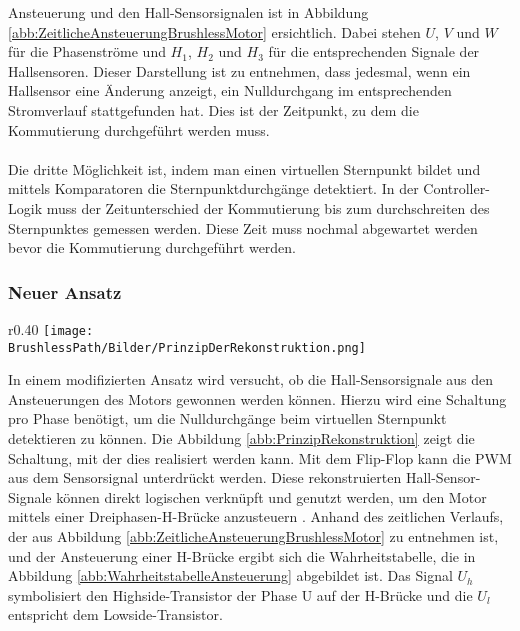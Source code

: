         Ansteuerung und den Hall-Sensorsignalen ist in Abbildung 
        \ref{abb:ZeitlicheAnsteuerungBrushlessMotor} ersichtlich. Dabei stehen 
        $U$, $V$ und $W$ für die Phasenströme und $H_1$, $H_2$ und $H_3$ für die 
        entsprechenden Signale der Hallsensoren. Dieser Darstellung ist zu 
        entnehmen, dass jedesmal, wenn ein Hallsensor eine Änderung anzeigt, 
        ein Nulldurchgang im entsprechenden Stromverlauf stattgefunden hat. 
        Dies ist der Zeitpunkt, zu dem die Kommutierung durchgeführt werden 
        muss.\\
        \\
        Die dritte Möglichkeit ist, indem man einen virtuellen Sternpunkt 
        bildet und mittels Komparatoren die Sternpunktdurchgänge detektiert. 
        In der Controller-Logik muss der Zeitunterschied der Kommutierung 
        bis zum durchschreiten des Sternpunktes gemessen werden. Diese Zeit 
        muss nochmal abgewartet werden bevor die Kommutierung durchgeführt 
        werden.
    
    \subsubsection{Neuer Ansatz}
        \begin{wrapfigure}{r}{0.40\textwidth}
           	\texttt{[image: \\BrushlessPath/Bilder/PrinzipDerRekonstruktion.png]}
           	\centering
           	\caption[Schema des Rekonstruktionsprinzip]{Schema des Rekonstruktionsprinzip \cite{HSLU:Pluess}}
            \label{abb:PrinzipRekonstruktion}
        \end{wrapfigure}
        In einem modifizierten Ansatz wird versucht, ob die Hall-Sensorsignale 
        aus den Ansteuerungen des Motors gewonnen werden können. Hierzu wird 
        eine Schaltung pro Phase benötigt, um die Nulldurchgänge beim 
        virtuellen Sternpunkt detektieren zu können. Die Abbildung 
        \ref{abb:PrinzipRekonstruktion} zeigt die Schaltung, mit der dies 
        realisiert werden kann. Mit dem Flip-Flop kann die PWM aus dem 
        Sensorsignal unterdrückt werden. Diese rekonstruierten 
        Hall-Sensor-Signale können direkt logischen verknüpft und genutzt 
        werden, um den Motor mittels einer Dreiphasen-H-Brücke anzusteuern 
        \cite{HSLU:Pluess}. Anhand des zeitlichen Verlaufs, der aus Abbildung 
        \ref{abb:ZeitlicheAnsteuerungBrushlessMotor} zu entnehmen ist, und der 
        Ansteuerung einer H-Brücke ergibt sich die Wahrheitstabelle, die in 
        Abbildung \ref{abb:WahrheitstabelleAnsteuerung} abgebildet ist. Das 
        Signal $U_h$ symbolisiert den Highside-Transistor der Phase U auf der 
        H-Brücke und die $U_l$ entspricht dem Lowside-Transistor.\\      
        
